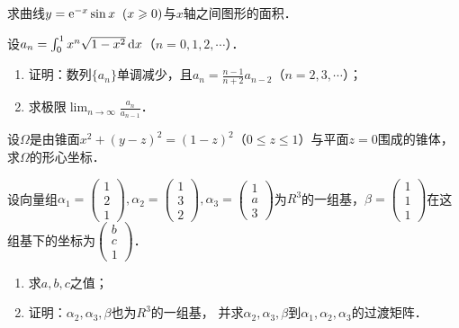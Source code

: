 \documentclass[plain,noanswer,medmath]{../../template/jnuexam}
\begin{document}
\begin{problem}[points=10]
求曲线$y = \mathrm{e}^{- x}\sin x\;\;(x \geqslant 0)$与$x$轴之间图形的面积．
\end{problem}


\begin{problem}[points=10]
设$a_n = \int_0^1 x^n\sqrt{1 - x^2} \mathop{}\!\mathrm{d} x$（$n = 0,1,2, \cdots$）．
\begin{enumerate}
\item 证明：数列$\{a_n\}$单调减少，且$a_n = \frac{n - 1}{n + 2}a_{n - 2}$（$n = 2,3, \cdots$）；
\item 求极限$\lim_{n \to \infty} \frac{a_n}{a_{n - 1}}$．
\end{enumerate}
\end{problem}


\begin{problem}[points=10]
设$\Omega$是由锥面$x^2 + (y - z)^2 = (1 - z)^2$（$0 \le z \le 1$）与平面$z = 0$围成的锥体，
求$\Omega$的形心坐标．
\end{problem}


\begin{problem}[points=11]
设向量组$\alpha_1 = \begin{pmatrix}
  1 \\
  2 \\
  1
\end{pmatrix},\alpha_2 = \begin{pmatrix}
  1 \\
  3 \\
  2
\end{pmatrix},\alpha_3 = \begin{pmatrix}
  1 \\
  a \\
  3
\end{pmatrix}$为$R^3$的一组基，$\beta = \begin{pmatrix}
  1 \\
  1 \\
  1
\end{pmatrix}$在这组基下的坐标为$\begin{pmatrix}
  b \\
  c \\
  1
\end{pmatrix}$．
\begin{enumerate}
\item 求$a,b,c$之值；
\item 证明：$\alpha_2,\alpha_3,\beta$也为$R^3$的一组基，
      并求$\alpha_2,\alpha_3,\beta$到$\alpha_1,\alpha_2,\alpha_3$的过渡矩阵．
\end{enumerate}
\end{problem}
\end{document}
